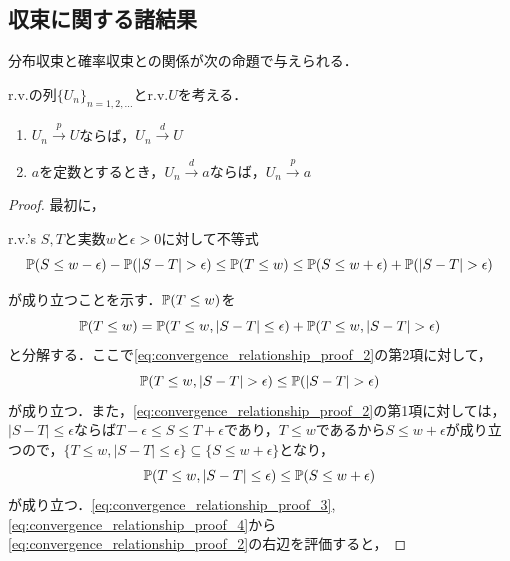\documentclass[main.tex]{subfiles}
\begin{document}
\subsection{収束に関する諸結果}
分布収束と確率収束との関係が次の命題で与えられる．
\begin{myproposition}{}
\label{prop:convergence_relationship} %
  r.v.の列$\{U_n\}_{n=1,2,\dots}$とr.v.$U$を考える．
  \begin{enumerate}[label=(\arabic*)]
    \item $U_n \xrightarrow{p} U$ならば，$U_n \xrightarrow{d} U$
    \item $a$を定数とするとき，$U_n \xrightarrow{d} a$ならば，$U_n \xrightarrow{p} a$
  \end{enumerate}
\end{myproposition}
\begin{proof}
  最初に，
\begin{bluebox}
r.v.'s $S,T$と実数$w$と$\epsilon >0$に対して不等式
\begin{equation}
  \mathbb{P}(S \leq w- \epsilon) - \mathbb{P}(|S - T| > \epsilon) \leq \mathbb{P}(T \leq w) \leq \mathbb{P}(S \leq w + \epsilon) + \mathbb{P}(|S - T| > \epsilon)
  \label{eq:convergence_relationship_proof_1}
\end{equation}
\end{bluebox}
が成り立つことを示す．$\mathbb{P}(T \leq w)$を
\begin{equation}
  \mathbb{P}(T \leq w) = \mathbb{P}(T \leq w, |S - T| \leq \epsilon) + \mathbb{P}(T \leq w, |S - T| > \epsilon)
  \label{eq:convergence_relationship_proof_2}
\end{equation}
と分解する．ここで\eqref{eq:convergence_relationship_proof_2}の第2項に対して，
\begin{equation}
  \mathbb{P}(T \leq w, |S - T| > \epsilon) \leq \mathbb{P}(|S - T| > \epsilon)
  \label{eq:convergence_relationship_proof_3}
\end{equation}
が成り立つ．また，\eqref{eq:convergence_relationship_proof_2}の第1項に対しては，$|S - T| \leq \epsilon$ならば$T - \epsilon \leq S \leq T + \epsilon$であり，$T \leq w$であるから$S \leq w + \epsilon$が成り立つので，$\{T \leq w, |S - T| \leq \epsilon\} \subseteq \{S \leq w + \epsilon\}$となり，
\begin{equation}
  \mathbb{P}(T \leq w, |S - T| \leq \epsilon) \leq \mathbb{P}(S \leq w + \epsilon)
  \label{eq:convergence_relationship_proof_4}
\end{equation}
が成り立つ．\eqref{eq:convergence_relationship_proof_3}, \eqref{eq:convergence_relationship_proof_4}から\eqref{eq:convergence_relationship_proof_2}の右辺を評価すると，

\end{proof}
\end{document}
